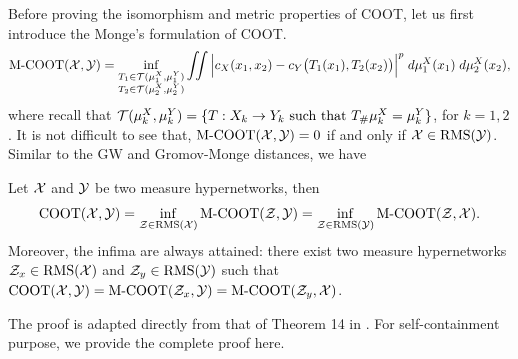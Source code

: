 Before proving the isomorphism and metric properties of COOT, let us first introduce the Monge's
formulation of COOT.
\begin{align}
  \text{M-COOT}(\mathcal X, \mathcal Y) =
  \inf_{\substack{T_1 \in \mathcal T(\mu^X_1, \mu^Y_1) \\ T_2 \in \mathcal T(\mu^X_2, \mu^Y_2)}}
  \iint \Big|c_X(x_1, x_2) - c_Y \big( T_1(x_1), T_2(x_2) \big) \Big|^p
  \; d\mu^X_1(x_1) \; d\mu^X_2(x_2),
\end{align}
where recall that
$\mathcal T(\mu^X_k, \mu^Y_k) = \{T: X_k \to Y_k \text{ such that } T_{\#} \mu^X_k = \mu^Y_k \}$,
for $k=1,2$. It is not difficult to see that, $\text{M-COOT}(\mathcal X, \mathcal Y) = 0$ if and only if
$\mathcal X \in \text{RMS}(\mathcal Y)$. Similar to the GW and Gromov-Monge distances, we have
\begin{corollary} \label{coro:coot_mcoot}
  Let $\mathcal X$ and $\mathcal Y$ be two measure hypernetworks, then
  \begin{equation}
    \text{COOT}(\mathcal X, \mathcal Y) = \inf_{\mathcal Z \in \text{RMS}(\mathcal X)} \text{M-COOT}(\mathcal Z, \mathcal Y)
    = \inf_{\mathcal Z \in \text{RMS}(\mathcal Y)} \text{M-COOT}(\mathcal Z, \mathcal X).
  \end{equation}
  Moreover, the infima are always attained: there exist two measure hypernetworks
  $\mathcal Z_x \in \text{RMS}(\mathcal X)$ and $\mathcal Z_y \in \text{RMS}(\mathcal Y)$ such that
  $\text{COOT}(\mathcal X, \mathcal Y) = \text{M-COOT}(\mathcal Z_x, \mathcal Y) = \text{M-COOT}(\mathcal Z_y, \mathcal X)$.
\end{corollary}
The proof is adapted directly from that of Theorem 14 in \citep{Memoli21}.
For self-containment purpose, we provide the complete proof here.
